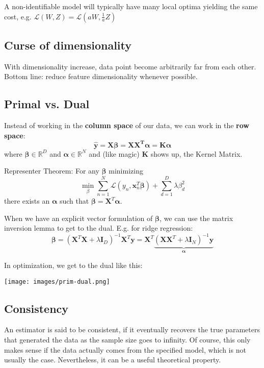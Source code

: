 \documentclass[10pt,a4paper,landscape]{article}
\renewcommand{\bf}[1]{\ensuremath{\mathbf{#1}}}
\newcommand{\balpha}{\boldsymbol\alpha}
\newcommand{\bbeta}{\boldsymbol\beta}
\begin{document}
\begin{multicols*}{4}
A non-identifiable model will typically have many local optima yielding the same cost, e.g. $\mathcal{L}(W, Z) = \mathcal{L}(aW, \frac{1}{a} Z)$

\subsection{Curse of dimensionality}
With dimensionality increase, data point become arbitrarily far from each other. %
Bottom line: reduce feature dimensionality whenever possible.

\subsection{Primal vs. Dual}
Instead of working in the \textbf{column space} of our data, we can work in the \textbf{row space}:
$$\bf{\hat{y} = X \bbeta = X X^T \balpha = K \balpha}$$
where $\bbeta \in \mathbb{R}^D$ and $\balpha \in \mathbb{R}^N$
and (like magic) $\bf{K}$ shows up, the Kernel Matrix.

Representer Theorem: For any $\bbeta$ minimizing
$$\min_\beta \sum_{n=1}^N \mathcal{L}(y_n, \bf{x}_n^T \bbeta) + \sum_{d=1}^D \lambda \beta_d^2$$
there exists an $\balpha$ such that $\bbeta = \bf{X}^T \balpha$.

When we have an explicit vector formulation of $\bbeta$, we can use the matrix inversion lemma to get to the dual. E.g. for ridge regression:
$$\bbeta = (\bf{X}^T \bf{X}  + \lambda \bf{I}_D)^{-1} \bf{X}^T \bf{y}= \bf{X}^T \underbrace{(\bf{X X}^T + \lambda \bf{I}_N)^{-1} \bf{y}}_{\balpha}$$

In optimization, we get to the dual like this:
\begin{colfig}
  \centering
  \texttt{[image: images/prim-dual.png]}
\end{colfig}

\subsection{Consistency}
An estimator is said to be consistent, if it eventually recovers the true parameters that generated the data as the sample size goes to infinity. Of course, this only makes sense if the data actually comes from the specified model, which is not usually the case. Nevertheless, it can be a useful theoretical property.


\end{multicols*}
\end{document}
